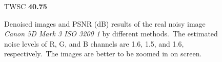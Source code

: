 \begin{figure}
{\begin{minipage}[t]{0.19\textwidth}
{\footnotesize TWSC \textbf{40.75}}
\end{minipage}
}
    \caption{Denoised images and PSNR (dB) results of the real noisy image \textsl{Canon 5D Mark 3 ISO 3200 1} \cite{crosschannel2016} by different methods.\ The estimated noise levels of R, G, and B channels are 1.6, 1.5, and 1.6, respectively.\ The images are better to be zoomed in on screen.}
    \label{fig5-11}
\end{figure}


\begin{figure}
    \centering
{}
\end{figure}
